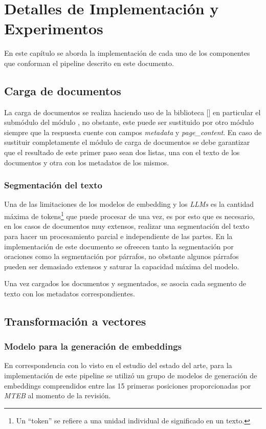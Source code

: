 \chapter{Detalles de Implementación y Experimentos}\label{chapter:implementation}
En este capítulo se aborda la implementación de cada uno de los componentes que conforman el \´pipeline\´
descrito en este documento.

\section{Carga de documentos}
La carga de documentos se realiza haciendo uso de la biblioteca [\cite{langchain}]
en particular el submódulo del módulo , no obstante, este puede ser sustituido por otro módulo siempre que la respuesta cuente con campos \emph{metadata} y \emph{page_content}. En caso de sustituir completamente el módulo de carga de documentos se debe garantizar que el resultado de este primer paso sean dos listas, una con el texto de los documentos y otra con los metadatos de los mismos.
    \subsection{Segmentación del texto}
        Una de las limitaciones de los modelos de embedding y los \emph{LLMs} es la cantidad máxima de tokens\footnote{Un “token” se refiere a una unidad individual de significado en un texto.} que puede procesar de una vez, es por esto que es necesario, en los casos de documentos muy extensos, realizar una segmentación del texto para hacer un procesamiento parcial e independiente de las partes.
        En la implementación de este documento se ofreecen tanto la segmentación por oraciones como la segmentación por párrafos, no obstante algunos párrafos pueden ser demasiado extensos y saturar la capacidad máxima del modelo.

Una vez cargados los documentos y segmentados, se asocia cada segmento de texto con los metadatos correspondientes.

\section{Transformación a vectores}
    \subsection{Modelo para la generación de embeddings}
        En correspondencia con lo visto en el estudio del estado del arte, para la implementación de este pipeline se utilizó un grupo de modelos de generación de embeddings comprendidos entre las 15 primeras posiciones proporcionadas por \emph{MTEB}\cite{leaderboard} al momento de la revisión.

